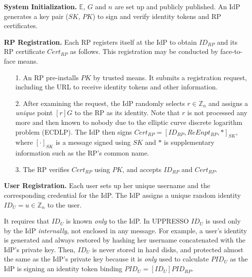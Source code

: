 \noindent \textbf{System Initialization.}
$\mathbb{E}$, $G$ and $n$ are set up and publicly published.
An IdP generates a key pair ($SK$, $PK$) to sign and verify identity tokens and RP certificates.


\noindent\textbf{RP Registration.}
Each RP registers itself at the IdP to obtain $ID_{RP}$ and its RP certificate $Cert_{RP}$ as follows.
This registration may be conducted by face-to-face means.
\begin{enumerate}
\setlength{\topsep}{0pt}
\setlength{\partopsep}{0pt}
\setlength{\itemsep}{0pt}
\setlength{\parsep}{0pt}
\setlength{\parskip}{0pt}
\item[1.]
An RP pre-installs $PK$ by trusted means.
It submits a registration request, including the URL to receive identity tokens and other information.
\item[2.]
After examining the request,
the IdP randomly selects $r \in \mathbb{Z}_n$
        and assigns a \emph{unique} point $[r]G$ to the RP as its identity.
Note that $r$ is not processed any more and then known to nobody
 due to the elliptic curve discrete logarithm problem (ECDLP).
The IdP then signs $Cert_{RP} = [ID_{RP}, ReEnpt_{RP}, *]_{SK}$,
     where $[\cdot]_{SK}$ is a message signed using $SK$ and $*$ is supplementary information such as the RP's common name.
\item[3.]
The RP verifies $Cert_{RP}$ using $PK$, and accepts $ID_{RP}$ and $Cert_{RP}$.
\end{enumerate}


\noindent\textbf{User Registration.}
Each user sets up her unique username and the corresponding credential for the IdP.
The IdP assigns
a unique random identity $ID_U = u\in \mathbb{Z}_n$ to the user.

It requires that $ID_U$ is known \emph{only} to the IdP.
In UPPRESSO $ID_U$ is used only by the IdP \emph{internally},
 not enclosed in any message.
For example, a user's identity is generated and always restored by hashing her username concatenated with the IdP's private key.
Then,
 $ID_U$ is never stored in hard disks,
 and protected almost the same as the IdP's private key
because it is \emph{only} used to calculate $PID_{U}$ as the IdP is signing an identity token binding $PID_{U}=
  [{ID_U}]{PID_{RP}}$.


